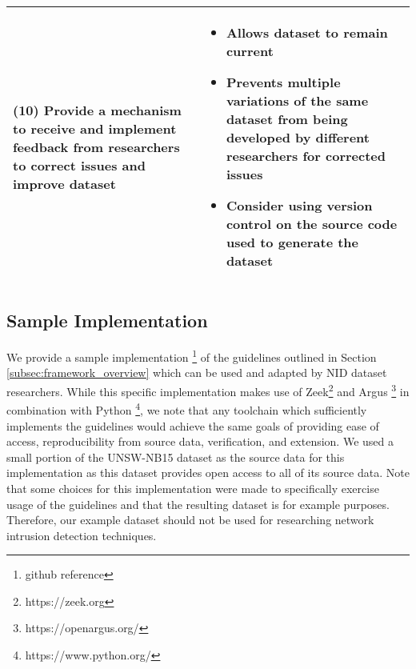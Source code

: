 \documentclass[conference]{IEEEtran}
\begin{document}
\begin{table*}
\begin{tabular}{m{8cm} m{8cm}}
    \textbf{(10) Provide a mechanism to receive and implement feedback from researchers to correct issues and improve dataset} &
        \begin{itemize}
            \item Allows dataset to remain current
            \item Prevents multiple variations of the same dataset from being developed by different researchers for corrected issues
            \item Consider using version control on the source code used to generate the dataset
        \end{itemize} \\
    \hline
\end{tabular}
\end{table*}
\endgroup

\subsection{Sample Implementation}\label{subsec:framework_implementation}
We provide a sample implementation \footnote{github reference} of the guidelines outlined in Section \ref{subsec:framework_overview} which can be used and adapted by NID dataset researchers.
While this specific implementation makes use of Zeek\footnote{https://zeek.org} and Argus \footnote{https://openargus.org/} in combination with Python \footnote{https://www.python.org/}, we note that any toolchain which sufficiently implements the guidelines would achieve the same goals of providing ease of access, reproducibility from source data, verification, and extension.
We used a small portion of the UNSW-NB15 dataset \cite{unswnb15} as the source data for this implementation as this dataset provides open access to all of its source data.
Note that some choices for this implementation were made to specifically exercise usage of the guidelines and that the resulting dataset is for example purposes.
Therefore, our example dataset should not be used for researching network intrusion detection techniques.
\end{document}
